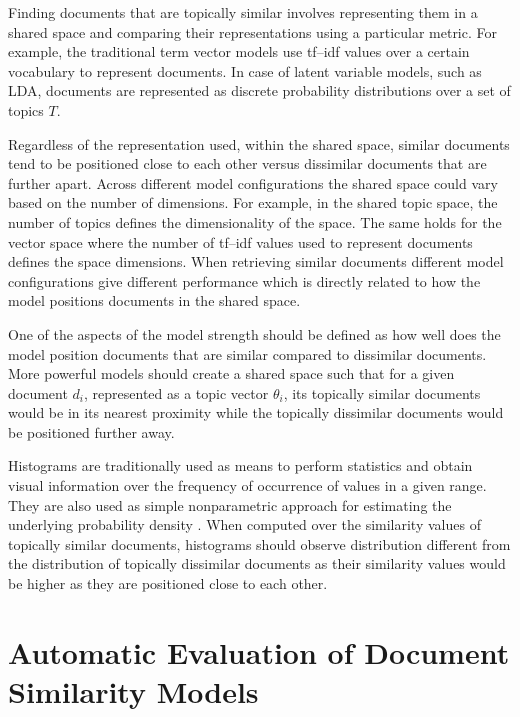 \documentclass[letterpaper]{article}
\begin{document}
Finding documents that are topically similar involves representing them in a shared space and comparing their representations using a particular metric. For example, the traditional term vector models use tf--idf values over a certain vocabulary to represent documents. In case of latent variable models, such as LDA, documents are represented as discrete probability distributions over a set of topics $T$. 

Regardless of the representation used, within the shared space, similar documents tend to be positioned close to each other versus dissimilar documents that are further apart. Across different model configurations the shared space could vary based on the number of dimensions. For example, in the shared topic space, the number of topics defines the dimensionality of the space. The same holds for the vector space where the number of tf--idf values used to represent documents defines the space dimensions. When retrieving similar documents different model configurations give different performance which is directly related to how the model positions documents in the shared space. 

One of the aspects of the model strength should be defined as how well does the model position documents that are similar compared to dissimilar documents. More powerful models should create a shared space such that for a given document $d_{i}$, represented as a topic vector $\theta_{i}$, its topically similar documents would be in its nearest proximity while the topically dissimilar documents would be positioned further away. 

Histograms are traditionally used as means to perform statistics and obtain visual information over the frequency of occurrence of values in a given range. They are also used as simple nonparametric approach for estimating the underlying probability density \cite{Bishop}. When computed over the similarity values of topically similar documents, histograms should observe distribution different from the distribution of topically dissimilar documents as their similarity values would be higher as they are positioned close to each other. 

\section{Automatic Evaluation of Document Similarity Models}
\label{sec:hsa}
\end{document}
